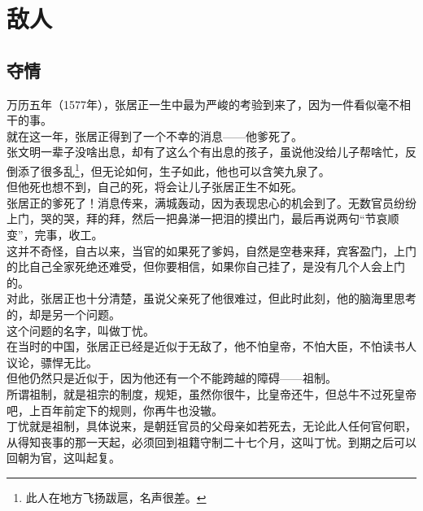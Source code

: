 \section{敌人}
\ifnum{}
	\begin{multicols}{\theparacolNo}
\fi
\subsection{夺情}
万历五年（1577年），张居正一生中最为严峻的考验到来了，因为一件看似毫不相干的事。\\

就在这一年，张居正得到了一个不幸的消息——他爹死了。\\

张文明一辈子没啥出息，却有了这么个有出息的孩子，虽说他没给儿子帮啥忙，反倒添了很多乱\footnote{此人在地方飞扬跋扈，名声很差。}，但无论如何，生子如此，他也可以含笑九泉了。\\

但他死也想不到，自己的死，将会让儿子张居正生不如死。\\

张居正的爹死了！消息传来，满城轰动，因为表现忠心的机会到了。无数官员纷纷上门，哭的哭，拜的拜，然后一把鼻涕一把泪的摸出门，最后再说两句“节哀顺变”，完事，收工。\\

这并不奇怪，自古以来，当官的如果死了爹妈，自然是空巷来拜，宾客盈门，上门的比自己全家死绝还难受，但你要相信，如果你自己挂了，是没有几个人会上门的。\\

对此，张居正也十分清楚，虽说父亲死了他很难过，但此时此刻，他的脑海里思考的，却是另一个问题。\\

这个问题的名字，叫做丁忧。\\

在当时的中国，张居正已经是近似于无敌了，他不怕皇帝，不怕大臣，不怕读书人议论，骠悍无比。\\

但他仍然只是近似于，因为他还有一个不能跨越的障碍——祖制。\\

所谓祖制，就是祖宗的制度，规矩，虽然你很牛，比皇帝还牛，但总牛不过死皇帝吧，上百年前定下的规则，你再牛也没辙。\\

丁忧就是祖制，具体说来，是朝廷官员的父母亲如若死去，无论此人任何官何职，从得知丧事的那一天起，必须回到祖籍守制二十七个月，这叫丁忧。到期之后可以回朝为官，这叫起复。\\


\end{multicols}
